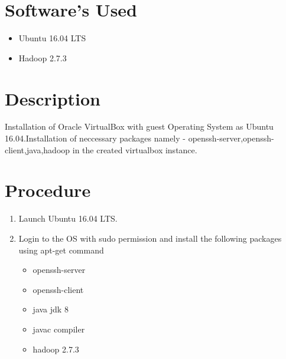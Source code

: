\documentclass[a4paper,10pt]{article}
\begin{document}
\section{Software's Used}
\begin{itemize}
  \item Ubuntu  16.04 LTS
  \item Hadoop 2.7.3
\end{itemize}

\section{Description}
Installation of Oracle VirtualBox with guest Operating System as Ubuntu 16.04.Installation of neccessary packages namely - openssh-server,openssh-client,java,hadoop in the created virtualbox instance.
\section{Procedure}

\begin{enumerate}
	\item Launch Ubuntu 16.04 LTS.
	\item Login to the OS with sudo permission and install the following packages using apt-get command
	\begin{itemize}
		\item openssh-server
		\item openssh-client
		\item java jdk 8
		\item javac compiler
                     \item hadoop 2.7.3
	\end{itemize}
\pagebreak
\end{enumerate}
\end{document}
